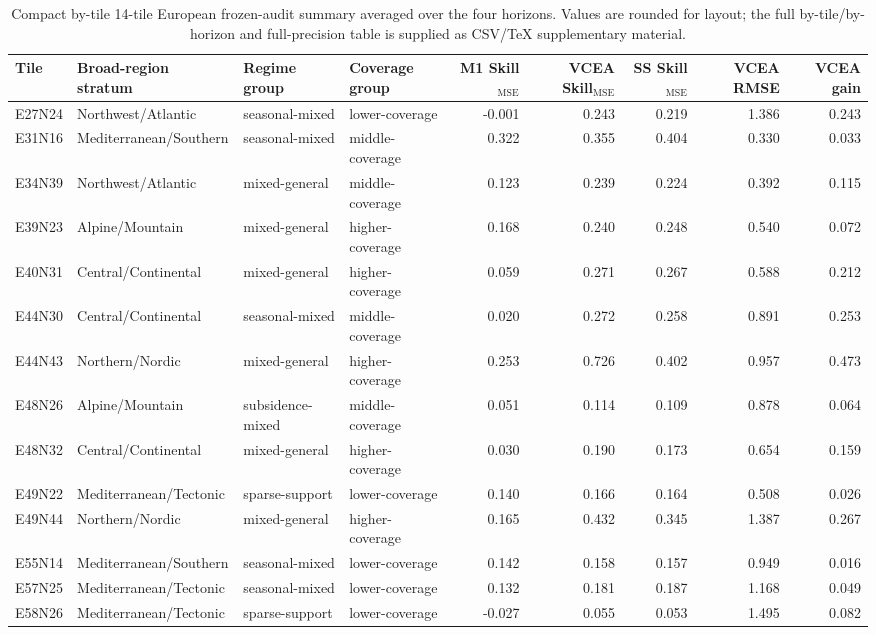 \documentclass[lettersize,journal]{IEEEtran}
\begin{document}
\begin{table}[!t]
\centering
\scriptsize
\begin{adjustbox}{max width=\textwidth}
\begin{tabular}{llllrrrrr}
\toprule
Tile & Broad-region stratum & Regime group & Coverage group & M1 Skill$_{\mathrm{MSE}}$ & VCEA Skill$_{\mathrm{MSE}}$ & SS Skill$_{\mathrm{MSE}}$ & VCEA RMSE & VCEA gain \\
\midrule
E27N24 & Northwest/Atlantic & seasonal-mixed & lower-coverage & -0.001 & 0.243 & 0.219 & 1.386 & 0.243 \\
E31N16 & Mediterranean/Southern & seasonal-mixed & middle-coverage & 0.322 & 0.355 & 0.404 & 0.330 & 0.033 \\
E34N39 & Northwest/Atlantic & mixed-general & middle-coverage & 0.123 & 0.239 & 0.224 & 0.392 & 0.115 \\
E39N23 & Alpine/Mountain & mixed-general & higher-coverage & 0.168 & 0.240 & 0.248 & 0.540 & 0.072 \\
E40N31 & Central/Continental & mixed-general & higher-coverage & 0.059 & 0.271 & 0.267 & 0.588 & 0.212 \\
E44N30 & Central/Continental & seasonal-mixed & middle-coverage & 0.020 & 0.272 & 0.258 & 0.891 & 0.253 \\
E44N43 & Northern/Nordic & mixed-general & higher-coverage & 0.253 & 0.726 & 0.402 & 0.957 & 0.473 \\
E48N26 & Alpine/Mountain & subsidence-mixed & middle-coverage & 0.051 & 0.114 & 0.109 & 0.878 & 0.064 \\
E48N32 & Central/Continental & mixed-general & higher-coverage & 0.030 & 0.190 & 0.173 & 0.654 & 0.159 \\
E49N22 & Mediterranean/Tectonic & sparse-support & lower-coverage & 0.140 & 0.166 & 0.164 & 0.508 & 0.026 \\
E49N44 & Northern/Nordic & mixed-general & higher-coverage & 0.165 & 0.432 & 0.345 & 1.387 & 0.267 \\
E55N14 & Mediterranean/Southern & seasonal-mixed & lower-coverage & 0.142 & 0.158 & 0.157 & 0.949 & 0.016 \\
E57N25 & Mediterranean/Tectonic & seasonal-mixed & lower-coverage & 0.132 & 0.181 & 0.187 & 1.168 & 0.049 \\
E58N26 & Mediterranean/Tectonic & sparse-support & lower-coverage & -0.027 & 0.055 & 0.053 & 1.495 & 0.082 \\
\bottomrule
\end{tabular}
\end{adjustbox}
\caption{Compact by-tile 14-tile European frozen-audit summary averaged over the four horizons. Values are rounded for layout; the full by-tile/by-horizon and full-precision table is supplied as CSV/TeX supplementary material.}
\label{tab:e7_by_tile_compact}
\end{table}
\end{document}
